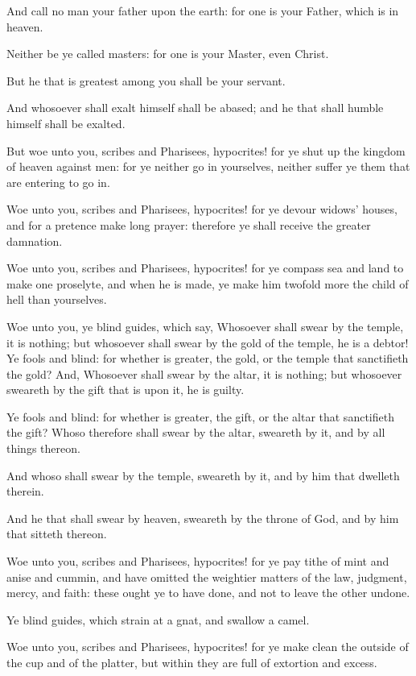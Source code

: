 \verse And call no man your father upon the earth: for one is your Father, which is in heaven.

\verse Neither be ye called masters: for one is your Master, even Christ.

\verse But he that is greatest among you shall be your servant.

\verse And whosoever shall exalt himself shall be abased; and he that shall humble himself shall be exalted.

\verse But woe unto you, scribes and Pharisees, hypocrites! for ye shut up the kingdom of heaven against men: for ye neither go in yourselves, neither suffer ye them that are entering to go in.

\verse Woe unto you, scribes and Pharisees, hypocrites! for ye devour widows' houses, and for a pretence make long prayer: therefore ye shall receive the greater damnation.

\verse Woe unto you, scribes and Pharisees, hypocrites! for ye compass sea and land to make one proselyte, and when he is made, ye make him twofold more the child of hell than yourselves.

\verse Woe unto you, ye blind guides, which say, Whosoever shall swear by the temple, it is nothing; but whosoever shall swear by the gold of the temple, he is a debtor!  \verse Ye fools and blind: for whether is greater, the gold, or the temple that sanctifieth the gold?  \verse And, Whosoever shall swear by the altar, it is nothing; but whosoever sweareth by the gift that is upon it, he is guilty.

\verse Ye fools and blind: for whether is greater, the gift, or the altar that sanctifieth the gift?  \verse Whoso therefore shall swear by the altar, sweareth by it, and by all things thereon.

\verse And whoso shall swear by the temple, sweareth by it, and by him that dwelleth therein.

\verse And he that shall swear by heaven, sweareth by the throne of God, and by him that sitteth thereon.

\verse Woe unto you, scribes and Pharisees, hypocrites! for ye pay tithe of mint and anise and cummin, and have omitted the weightier matters of the law, judgment, mercy, and faith: these ought ye to have done, and not to leave the other undone.

\verse Ye blind guides, which strain at a gnat, and swallow a camel.

\verse Woe unto you, scribes and Pharisees, hypocrites! for ye make clean the outside of the cup and of the platter, but within they are full of extortion and excess.

